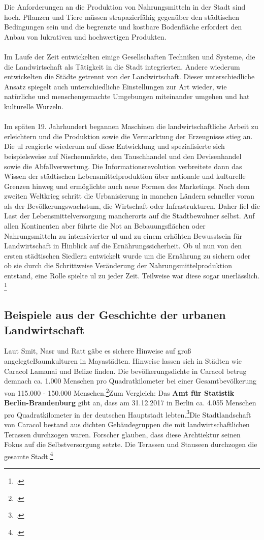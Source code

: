 \documentclass{scrartcl}
\begin{document}
Die Anforderungen an die Produktion von Nahrungsmitteln in der Stadt sind hoch. Pflanzen und Tiere müssen strapazierfähig gegenüber den städtischen Bedingungen sein und die begrenzte und kostbare Bodenfläche erfordert den Anbau von lukrativen und hochwertigen Produkten.\\ 
\\
Im Laufe der Zeit entwickelten einige Gesellschaften Techniken und Systeme, die die Landwirtschaft als Tätigkeit in die Stadt integrierten. Andere wiederum entwickelten die Städte getrennt von der Landwirtschaft. Dieser unterschiedliche Ansatz spiegelt auch unterschiedliche Einstellungen zur Art wieder, wie natürliche und menschengemachte Umgebungen miteinander umgehen und hat kulturelle Wurzeln.\\
\\
Im späten 19. Jahrhundert begannen Maschinen die landwirtschaftliche Arbeit zu erleichtern und die Produktion sowie die Vermarktung der Erzeugnisse stieg an. Die \acs{ul} reagierte wiederum auf diese Entwicklung und spezialisierte sich beispielsweise auf Nischenmärkte, den Tauschhandel und den Devisenhandel sowie die Abfallverwertung. Die Informationsrevolution verbreitete dann das Wissen der städtischen Lebensmittelproduktion über nationale und kulturelle Grenzen hinweg und ermöglichte auch neue Formen des Marketings. Nach dem zweiten Weltkrieg schritt die Urbanisierung in manchen Ländern schneller voran als der Bevölkerungswachstum, die Wirtschaft oder Infrastrukturen. Daher fiel die Last der Lebensmittelversorgung mancherorts auf die Stadtbewohner selbst. Auf allen Kontinenten aber führte die Not an Bebauungsflächen oder Nahrungsmitteln zu intensivierter \acs{ul} und zu einem erhöhten Bewusstsein für Landwirtschaft in Hinblick auf die Ernährungssicherheit. Ob \acs{ul} nun von den ersten städtischen Siedlern entwickelt wurde um die Ernährung zu sichern oder ob sie durch die Schrittweise Veränderung der Nahrungsmittelproduktion entstand, eine Rolle spielte \acs{ul} zu jeder Zeit. Teilweise war diese sogar unerlässlich.  \footcite[Vgl.][S. 1-4]{Smit2001UrbanCities}

\subsection{Beispiele aus der Geschichte der urbanen Landwirtschaft}


Laut Smit, Nasr und Ratt gäbe es sichere Hinweise auf groß angelegteBaumkulturen in Mayastädten. Hinweise lassen sich in Städten wie Caracol Lamanai und Belize finden. Die bevölkerungsdichte in Caracol betrug demnach ca. 1.000 Menschen pro Quadratkilometer bei einer Gesamtbevölkerung von 115.000 - 150.000 Menschen.\footcite[Vgl.][S. 5-6]{Smit2001UrbanCities}Zum Vergleich: Das \textbf{Amt für Statistik Berlin-Brandenburg} gibt an, dass am 31.12.2017 in Berlin ca. 4.055 Menschen pro Quadratkilometer in der deutschen Hauptstadt lebten.\footcite[Vgl.]{AmtfurStatistikBerlin-Brandenburg2017NoTitle}Die Stadtlandschaft von Caracol bestand aus dichten Gebäudegruppen die mit landwirtschaftlichen Terassen durchzogen waren. Forscher glauben, dass diese Archtiektur seinen Fokus auf die Selbstversorgung setzte. Die Terassen und Stauseen durchzogen die gesamte Stadt.\footcite[Vgl.][S. 5-6]{Smit2001UrbanCities}
\end{document}
